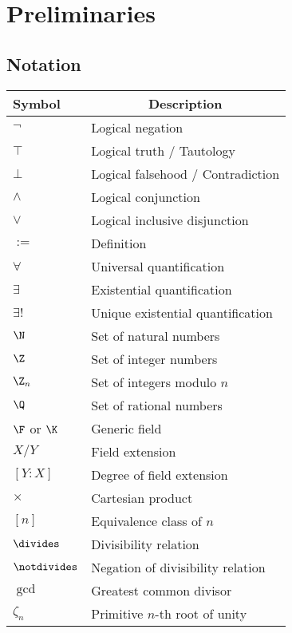 \chapter{Preliminaries}

\section{Notation}

\begin{tabular}{>{\centering}m{1.8cm} m{5.8cm}}
\toprule
\textbf{Symbol} & \multicolumn{1}{c}{\textbf{Description}} \\
\midrule
$\lnot$ & Logical negation \\
$\top$  & Logical truth / Tautology \\
$\bot$  & Logical falsehood / Contradiction \\
$\land$ & Logical conjunction \\
$\lor$ & Logical inclusive disjunction \\
$:=$   & Definition \\
$\forall$ & Universal quantification \\
$\exists$ & Existential quantification \\
$\exists!$ & Unique existential quantification \\
$\N$ & Set of natural numbers \\
$\Z$ & Set of integer numbers \\
$\Z_n$ & Set of integers modulo $n$ \\
$\Q$ & Set of rational numbers \\
$\F$ or $\K$ & Generic field \\
$X/Y$ & Field extension \\
$[Y:X]$ & Degree of field extension \\
$\times$ & Cartesian product \\
$[n]$ & Equivalence class of $n$ \\
$\divides$ & Divisibility relation \\
$\notdivides$ & Negation of divisibility relation \\
$\gcd$ & Greatest common divisor \\
$\zeta_n$ & Primitive $n$-th root of unity \\
\bottomrule
\end{tabular}

